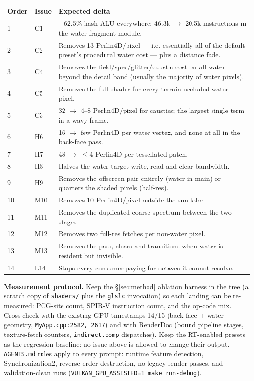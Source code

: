 \documentclass[11pt,a4paper]{article}
\begin{document}
\begin{table}[h]
\centering
\small
\begin{tabular}{@{}llp{6.6cm}@{}}
\toprule
\textbf{Order} & \textbf{Issue} & \textbf{Expected delta} \\
\midrule
1 & C1 & $-62.5\%$ hash ALU everywhere; 46.3k $\rightarrow$ 20.5k instructions in the water fragment module. \\
2 & C2 & Removes 13 Perlin4D/pixel --- i.e. essentially all of the default preset's procedural water cost --- plus a distance fade. \\
3 & C4 & Removes the field/spec/glitter/caustic cost on all water beyond the detail band (usually the majority of water pixels). \\
4 & C5 & Removes the full shader for every terrain-occluded water pixel. \\
5 & C3 & 32 $\rightarrow$ 4--8 Perlin4D/pixel for caustics; the largest single term in a wavy frame. \\
6 & H6 & 16 $\rightarrow$ few Perlin4D per water vertex, and none at all in the back-face pass. \\
7 & H7 & 48 $\rightarrow$ $\le$4 Perlin4D per tessellated patch. \\
8 & H8 & Halves the water-target write, read and clear bandwidth. \\
9 & H9 & Removes the offscreen pair entirely (water-in-main) or quarters the shaded pixels (half-res). \\
10 & M10 & Removes 10 Perlin4D/pixel outside the sun lobe. \\
11 & M11 & Removes the duplicated coarse spectrum between the two stages. \\
12 & M12 & Removes two full-res fetches per non-water pixel. \\
13 & M13 & Removes the pass, clears and transitions when water is resident but invisible. \\
14 & L14 & Stops every consumer paying for octaves it cannot resolve. \\
\bottomrule
\end{tabular}
\end{table}

\textbf{Measurement protocol.} Keep the \S\ref{sec:method} ablation harness in the tree (a scratch copy of
\texttt{shaders/} plus the \texttt{glslc} invocation) so each landing can be re-measured: PCG-site count, SPIR-V
instruction count, and the op-code mix. Cross-check with the existing GPU timestamps 14/15 (back-face $+$ water
geometry, \texttt{MyApp.cpp:2582, 2617}) and with RenderDoc (bound pipeline stages, texture-fetch counters,
\texttt{indirect.comp} dispatches). Keep the RT-enabled presets as the regression baseline: no issue above is allowed to
change their output. \texttt{AGENTS.md} rules apply to every prompt: runtime feature detection, Synchronization2,
reverse-order destruction, no legacy render passes, and validation-clean runs
(\texttt{VULKAN\_GPU\_ASSISTED=1 make run-debug}).
\end{document}
